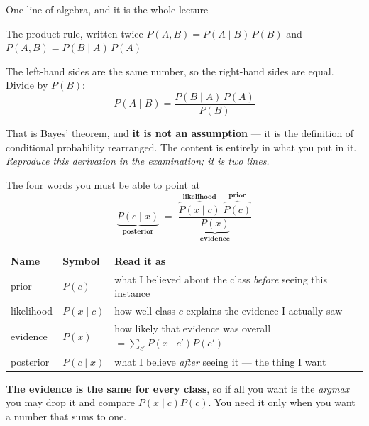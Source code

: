 \documentclass[aspectratio=169]{beamer}
\begin{document}
\begin{frame}[shrink=4]{One line of algebra, and it is the whole lecture}
  \begin{exampleblock}{The product rule, written twice}
    \centering
    $P(A, B) = P(A \mid B)\,P(B)$ \qquad and \qquad
    $P(A, B) = P(B \mid A)\,P(A)$
  \end{exampleblock}
  \vspace{0.2em}
  \begin{center}
    The left-hand sides are the same number, so the right-hand sides are
    equal. Divide by $P(B)$:
    \[
      \boxed{\;P(A \mid B) = \frac{P(B \mid A)\,P(A)}{P(B)}\;}
    \]
  \end{center}
  \begin{center}\small
    That is Bayes' theorem, and \textbf{it is not an assumption} --- it is the
    definition of conditional probability rearranged. The content is entirely
    in what you put in it. \emph{Reproduce this derivation in the
    examination; it is two lines.}
  \end{center}
\end{frame}

\begin{frame}[shrink=5]{The four words you must be able to point at}
  \[
    \underbrace{P(c \mid x)}_{\textbf{posterior}} \;=\;
    \frac{\overbrace{P(x \mid c)}^{\textbf{likelihood}}\;
          \overbrace{P(c)}^{\textbf{prior}}}
         {\underbrace{P(x)}_{\textbf{evidence}}}
  \]
  \begin{center}\small
  \begin{tabular}{@{}llp{6.6cm}@{}}
    \toprule
    \textbf{Name} & \textbf{Symbol} & \textbf{Read it as}\\
    \midrule
    prior & $P(c)$ & what I believed about the class \emph{before} seeing
      this instance\\
    likelihood & $P(x \mid c)$ & how well class $c$ explains the evidence I
      actually saw\\
    evidence & $P(x)$ & how likely that evidence was overall
      $= \sum_{c'} P(x \mid c')P(c')$\\
    posterior & $P(c \mid x)$ & what I believe \emph{after} seeing it ---
      the thing I want\\
    \bottomrule
  \end{tabular}
  \end{center}
  \begin{center}\small
    \textbf{The evidence is the same for every class}, so if all you want is
    the \emph{argmax} you may drop it and compare
    $P(x \mid c)P(c)$. You need it only when you want a number that sums to
    one.
  \end{center}
\end{frame}
\end{document}
